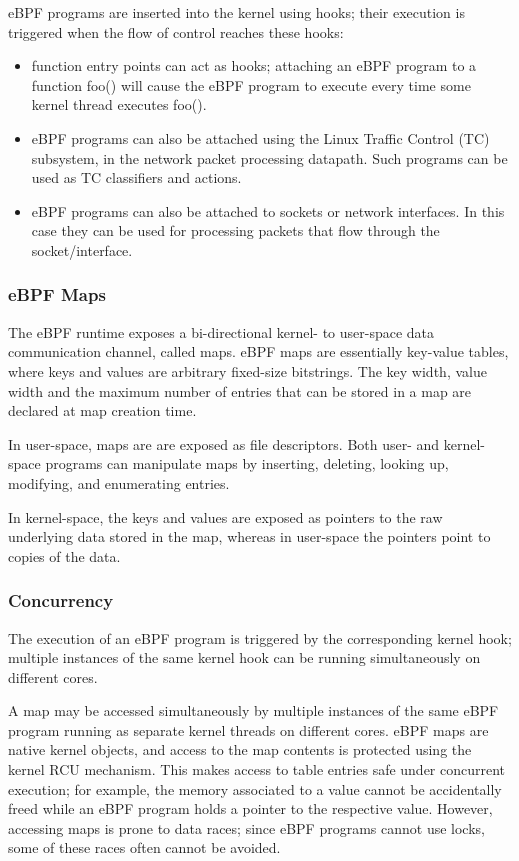 eBPF programs are inserted into the kernel using hooks; their
execution is triggered when the flow of control reaches these hooks:


\begin{itemize}
\item function entry points can act as hooks; attaching an eBPF
  program to a function foo() will cause the eBPF program to execute
  every time some kernel thread executes foo().

\item eBPF programs can also be attached using the Linux Traffic
  Control (TC) subsystem, in the network packet processing
  datapath. Such programs can be used as TC classifiers and actions.

\item eBPF programs can also be attached to sockets or network
  interfaces. In this case they can be used for processing packets
  that flow through the socket/interface.
\end{itemize}

\subsubsection{eBPF Maps}

The eBPF runtime exposes a bi-directional kernel- to user-space data
communication channel, called maps.  eBPF maps are essentially
key-value tables, where keys and values are arbitrary fixed-size
bitstrings.  The key width, value width and the maximum number of
entries that can be stored in a map are declared at map creation time.

In user-space, maps are are exposed as file descriptors. Both user- and
kernel-space programs can manipulate maps by inserting, deleting,
looking up, modifying, and enumerating entries.

In kernel-space, the keys and values are exposed as pointers to the raw
underlying data stored in the map, whereas in user-space the
pointers point to copies of the data.

\subsubsection{Concurrency}

The execution of an eBPF program is triggered by the corresponding
kernel hook; multiple instances of the same kernel hook can be running
simultaneously on different cores.

A map may be accessed simultaneously by multiple instances of the same
eBPF program running as separate kernel threads on different cores.
eBPF maps are native kernel objects, and access to the map contents is
protected using the kernel RCU mechanism. This makes access to table
entries safe under concurrent execution; for example, the memory
associated to a value cannot be accidentally freed while an eBPF
program holds a pointer to the respective value.  However, accessing
maps is prone to data races; since eBPF programs cannot use locks,
some of these races often cannot be avoided.

